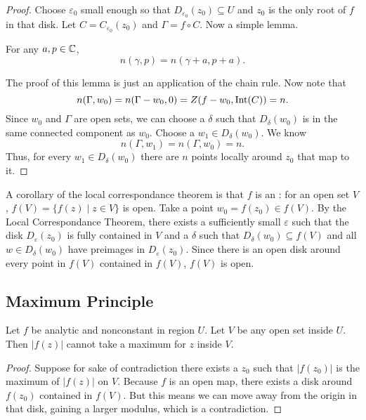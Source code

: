 \begin{proof}
    Choose $\varepsilon_0$ small enough so that $D_{\varepsilon_0}
    (z_0) \subseteq U$ and $z_0$ is the only root of $f$ in that 
    disk.
    Let $C = C_{\varepsilon_0}(z_0)$ and $\Gamma = f \circ C$.
    Now a simple lemma.
    \begin{lemma}
        For any $a, p \in \operatorname{\mathbb{C}}$,
        \[ n(\gamma, p) = n(\gamma + a, p + a). \]
    \end{lemma}

    \noindent
    The proof of this lemma is just an application of the chain
    rule.
    Now note that
    \[ n(\Gamma, w_0) = n(\Gamma - w_0, 0) = Z(f-w_0, \operatorname{Int}(C)) 
    = n. \]
    Since $w_0$ and $\Gamma$ are open sets, we can choose a $\delta$
    such that $D_{\delta} (w_0)$ is in the same connected component
    as $w_0$.
    Choose a $w_1 \in D_{\delta}(w_0)$.
    We know
    \[ n(\Gamma, w_1) = n(\Gamma, w_0) = n. \]
    Thus, for every $w_1 \in D_{\delta}(w_0)$ there are $n$ points
    locally around $z_0$ that map to it.
\end{proof}

A corollary of the local correspondance theorem is that $f$ is 
an : for an open set $V$, $f(V) = \{f(z) \; | \; 
z \in V\}$ is open. 
Take a point $w_0 = f(z_0) \in f(V)$.
By the Local Correspondance Theorem,
there exists a sufficiently small $\varepsilon$ such that 
the disk $D_{\varepsilon}(z_0)$ is fully 
contained in $V$ and a $\delta$ such that $D_{\delta}(w_0) \subseteq f(V)$ and 
all $w \in D_{\delta}(w_0)$ have preimages in $D_{\varepsilon}(z_0)$.
Since there is an open disk around every point in $f(V)$
contained in $f(V)$, $f(V)$ is open.

\subsection{Maximum Principle}

\begin{theorem}
    Let $f$ be analytic and nonconstant in region $U$.
    Let $V$ be any open set inside $U$.
    Then $|f(z)|$ cannot take a maximum for $z$ inside $V$.
\end{theorem}

\begin{proof}
    Suppose for sake of contradiction there exists a $z_0$ 
    such that $|f(z_0)|$ is the maximum of $|f(z)|$ on $V$.
    Because $f$ is an open map, 
    there exists a disk around $f(z_0)$ contained in
    $f(V)$.  But this means we can move away from the origin in
    that disk, gaining a larger modulus, which is a 
    contradiction.
\end{proof}

